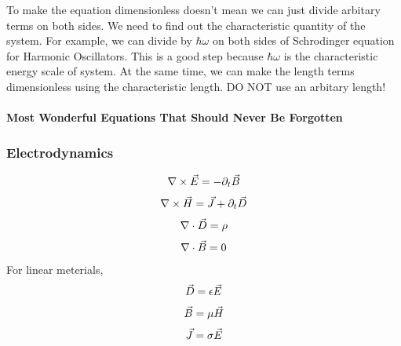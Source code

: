 \documentclass[letterpaper,10pt,english]{sphinxmanual}
\begin{document}
To make the equation dimensionless doesn't mean we can just divide arbitary terms on both sides. We need to find out the characteristic quantity of the system. For example, we can divide by \(\hbar\omega\) on both sides of Schrodinger equation for Harmonic Oscillators. This is a good step because \(\hbar\omega\) is the characteristic energy scale of system. At the same time, we can make the length terms dimensionless using the characteristic length. DO NOT use an arbitary length!


\paragraph{Most Wonderful Equations That Should Never Be Forgotten}
\label{Basic:most-wonderful-equations-that-should-never-be-forgotten}

\subsubsection{Electrodynamics}
\label{Basic:electrodynamics}\begin{gather}
\begin{split}\nabla\times\vec E=-\partial_t \vec B\end{split}\notag
\end{gather}\begin{gather}
\begin{split}\nabla\times\vec H=\vec J+\partial_t \vec D\end{split}\notag
\end{gather}\begin{gather}
\begin{split}\nabla\cdot \vec D=\rho\end{split}\notag
\end{gather}\begin{gather}
\begin{split}\nabla\cdot \vec B=0\end{split}\notag
\end{gather}
For linear meterials,
\begin{gather}
\begin{split}\vec D=\epsilon \vec E\end{split}\notag
\end{gather}\begin{gather}
\begin{split}\vec B=\mu \vec H\end{split}\notag
\end{gather}\begin{gather}
\begin{split}\vec J= \sigma \vec E\end{split}\notag
\end{gather}
\end{document}
